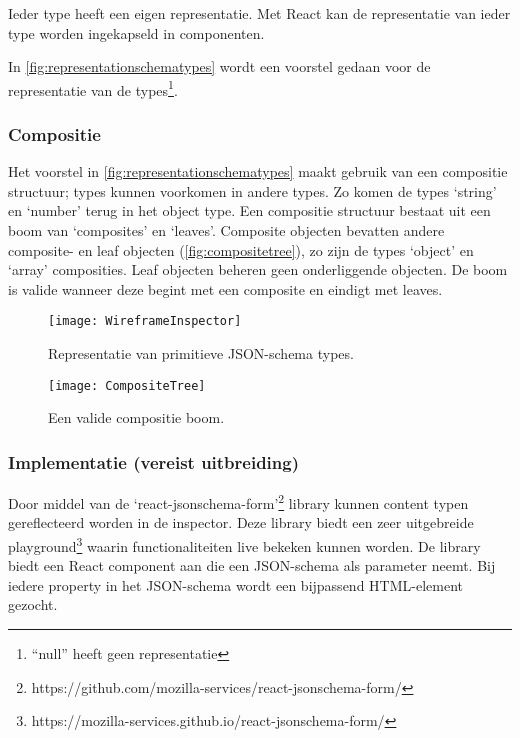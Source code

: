 \noindent Ieder type heeft een eigen representatie. Met React kan de representatie van ieder type worden ingekapseld in componenten.

In \autoref{fig:representationschematypes} wordt een voorstel gedaan voor de representatie van de types\footnote{“null” heeft geen representatie}.

\subsubsection{Compositie}
Het voorstel in \autoref{fig:representationschematypes} maakt gebruik van een compositie structuur; types kunnen voorkomen in andere types. Zo komen de types ‘string’ en ‘number’ terug in het object type. Een compositie structuur bestaat uit een boom van ‘composites’ en ‘leaves’. Composite objecten bevatten andere composite- en leaf objecten (\autoref{fig:compositetree}), zo zijn de types ‘object’ en ‘array’ composities. Leaf objecten beheren geen onderliggende objecten. De boom is valide wanneer deze begint met een composite en eindigt met leaves.

\begin{figure}[H]
    \centering
    \begin{minipage}{.5\textwidth}
        \centering
        \texttt{[image: WireframeInspector]}
        \caption{Representatie van primitieve JSON-schema types.}
        \label{fig:representationschematypes}    
    \end{minipage}%
    \begin{minipage}{.5\textwidth}
        \centering
        \texttt{[image: CompositeTree]}
        \caption{Een valide compositie boom.}
        \label{fig:compositetree}
    \end{minipage}
\end{figure}

\subsubsection{Implementatie (vereist uitbreiding)}
Door middel van de ‘react-jsonschema-form’\footnote{https://github.com/mozilla-services/react-jsonschema-form/} library kunnen content typen gereflecteerd worden in de inspector. Deze library biedt een zeer uitgebreide playground\footnote{https://mozilla-services.github.io/react-jsonschema-form/ } waarin functionaliteiten live bekeken kunnen worden.
De library biedt een React component aan die een JSON-schema als parameter neemt. Bij iedere property in het JSON-schema wordt een bijpassend HTML-element gezocht.

